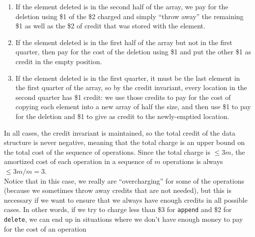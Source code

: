 \begin{enumerate}
  \item If the element deleted is in the second half of the array, we pay for the deletion using \$1 of the \$2 charged and simply ``throw away'' the remaining \$1 as well as the \$2 of credit that was stored with the element.
  \item If the element deleted is in the first half of the array but not in the first quarter, then pay for the cost of the deletion using \$1 and put the other \$1 as credit in the empty position.
  \item If the element deleted is in the first quarter, it must be the last  element in the first quarter of the array, so by the credit invariant, every location in the second quarter has \$1 credit: we use those credits to pay for the cost of copying each element into a new array of half the size, and then use \$1 to pay for the deletion and \$1 to give as credit to the newly-emptied location.
\end{enumerate}

\noindent In all cases, the credit invariant is maintained, so the total credit of the data structure is never negative, meaning that the total charge is an upper bound on the total cost of the sequence of operations. Since the total charge is $\leq 3m$, the amortized cost of each operation in a sequence of $m$ operations is always $\leq 3m/m = 3$. \\

\noindent Notice that in this case, we really are ``overcharging'' for some of the operations (because we sometimes throw away credits that are not needed), but this is necessary if we want to ensure that we always have enough credits in all possible cases. In other words, if we try to charge less than \$3 for \texttt{append} and \$2 for \texttt{delete}, we can end up in situations where we don't have enough money to pay for the cost of an operation


